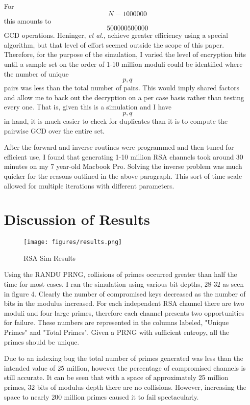 \documentclass[conference]{/Users/paul/MSEE/ee595/project/report/IEEEtran/IEEEtran}
\begin{document}
For $$N = 1000000$$ this amounts to $$500000500000$$ GCD operations. Heninger, \textit{et al.}, achieve greater efficiency using a special algorithm, but that level of effort seemed outside the scope of this paper.  Therefore, for the purpose of the simulation, I varied the level of encryption bits until a sample set on the order of 1-10 million moduli could be identified where the number of unique $$p, q$$ pairs was less than the total number of pairs. This would imply shared factors and allow
me to back out the decryption on a per case basis rather than testing every one. That is, given this is a simulation and I have $$p, q$$ in hand, it is much easier to check for duplicates than it is to compute the pairwise GCD over the entire set.   

    After the forward and inverse routines were programmed and then tuned for efficient use, I found that generating 1-10 million RSA channels took around 30 minutes on my 7 year-old Macbook Pro. Solving the inverse problem was much quicker for the reasons outlined in the above paragraph. This sort of time scale allowed for multiple iterations with different parameters. 
 
\section{Discussion of Results}
 
\begin{figure}[h]
    \texttt{[image: figures/results.png]}%
    \caption{RSA Sim Results}
\end{figure}
 
Using the RANDU PRNG, collisions of primes occurred greater than half the time for most cases. I ran the simulation using various bit depths, 28-32 as seen in figure 4. Clearly the number of compromised keys decreased as the number of bits in the modulus increased. For each independent RSA channel there are two moduli and four large primes, therefore each channel presents two opportunities for failure. These numbers are represented in the columns labeled, "Unique Primes" and "Total
Primes". Given a PRNG with sufficient entropy, all the primes should be unique. 

Due to an indexing bug the total number of primes generated was less than the intended value of 25 million, however the percentage of compromised channels is still accurate. It can be seen that with a space of approximately 25 million primes, 32 bits of modulus depth there are no collisions. However, increasing the space to nearly 200 million primes caused it to fail spectacularly. 
\end{document}
